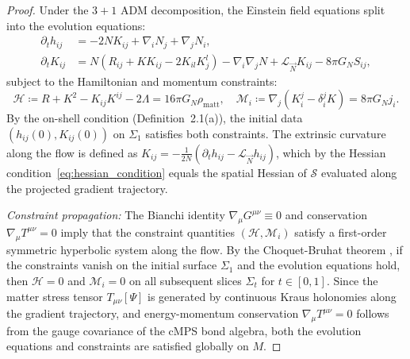 \documentclass[11pt,a4paper,reqno]{amsart}
\theoremstyle{definition}
\numberwithin{equation}{section}
\begin{document}
\begin{proof}
Under the $3+1$ ADM decomposition, the Einstein field equations split into the evolution equations:
\begin{align}
    \partial_t h_{ij} &= -2 N K_{ij} + \nabla_i N_j + \nabla_j N_i, \\
    \partial_t K_{ij} &= N \left( R_{ij} + K K_{ij} - 2 K_{il} K^l_j \right) - \nabla_i \nabla_j N + \mathcal{L}_{\vec{N}} K_{ij} - 8\pi G_N S_{ij},
\end{align}
subject to the Hamiltonian and momentum constraints:
\begin{equation}
    \mathcal{H} \coloneqq R + K^2 - K_{ij} K^{ij} - 2\Lambda = 16\pi G_N \rho_{\mathrm{matt}}, \quad \mathcal{M}_i \coloneqq \nabla_j (K^j_i - \delta^j_i K) = 8\pi G_N j_i.
\end{equation}
By the on-shell condition (Definition~2.1(a)), the initial data $(h_{ij}(0), K_{ij}(0))$ on $\Sigma_1$ satisfies both constraints. The extrinsic curvature along the flow is defined as $K_{ij} = -\frac{1}{2N}(\partial_t h_{ij} - \mathcal{L}_{\vec{N}} h_{ij})$, which by the Hessian condition~\eqref{eq:hessian_condition} equals the spatial Hessian of $\mathcal{S}$ evaluated along the projected gradient trajectory.

\emph{Constraint propagation:} The Bianchi identity $\nabla_\mu G^{\mu\nu} \equiv 0$ and conservation $\nabla_\mu T^{\mu\nu} = 0$ imply that the constraint quantities $(\mathcal{H}, \mathcal{M}_i)$ satisfy a first-order symmetric hyperbolic system along the flow. By the Choquet-Bruhat theorem \cite{choquet1952}, if the constraints vanish on the initial surface $\Sigma_1$ and the evolution equations hold, then $\mathcal{H} = 0$ and $\mathcal{M}_i = 0$ on all subsequent slices $\Sigma_t$ for $t \in [0,1]$. Since the matter stress tensor $T_{\mu\nu}[\Psi]$ is generated by continuous Kraus holonomies along the gradient trajectory, and energy-momentum conservation $\nabla_\mu T^{\mu\nu} = 0$ follows from the gauge covariance of the cMPS bond algebra, both the evolution equations and constraints are satisfied globally on $M$.
\end{proof}
\end{document}
